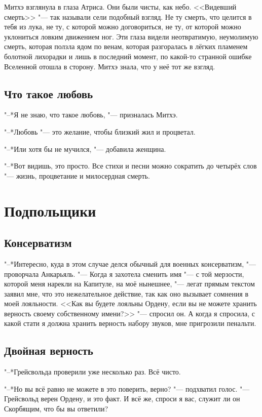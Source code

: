 Митхэ взглянула в глаза Атриса.
Они были чисты, как небо.
<<Видевший смерть>> "--- так называли сели подобный взгляд.
Не ту смерть, что целится в тебя из лука, не ту, с которой можно договориться, не ту, от которой можно уклониться ловким движением ног.
Эти глаза видели неотвратимую, неумолимую смерть, которая ползла ядом по венам, которая разгоралась в лёгких пламенем болотной лихорадки и лишь в последний момент, по какой-то странной ошибке Вселенной отошла в сторону.
Митхэ знала, что у неё тот же взгляд.

\section{Что такое любовь}

"--*Я не знаю, что такое любовь, "--- призналась Митхэ.

"--*Любовь "--- это желание, чтобы близкий жил и процветал.

"--*Или хотя бы не мучился, "--- добавила женщина.

"--*Вот видишь, это просто.
Все стихи и песни можно сократить до четырёх слов "--- жизнь, процветание и милосердная смерть.

\chapter{Подпольщики}

\section{Консерватизм}

"--*Интересно, куда в этом случае делся обычный для военных консерватизм, "--- проворчала Анкарьяль.
"--- Когда я захотела сменить имя "--- с той мерзости, которой меня нарекли на Капитуле, на моё нынешнее, "--- легат прямым текстом заявил мне, что это нежелательное действие, так как оно вызывает сомнения в моей лояльности.
<<Как вы будете лояльны Ордену, если вы не можете хранить верность своему собственному имени?>> "--- спросил он.
А когда я спросила, с какой стати я должна хранить верность набору звуков, мне пригрозили пенальти.

\section{Двойная верность}

"--*Грейсвольда проверили уже несколько раз.
Всё чисто.

"--*Но вы всё равно не можете в это поверить, верно? "--- подхватил голос.
"--- Грейсвольд верен Ордену, и это факт.
И всё же, спроси я вас, служит ли он Скорбящим, что бы вы ответили?

